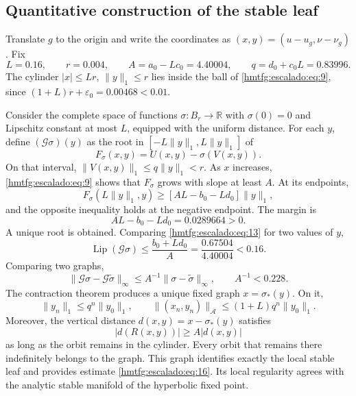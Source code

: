 \subsection{Quantitative construction of the stable leaf}
\label{hmtfg:escalado:5}

Translate \(g\) to the origin and write the coordinates as \((x,y)=(u-u_g,\nu-\nu_g)\). Fix
\begin{equation}
L=0.16,\qquad r=0.004,\qquad
A=a_0-Lc_0=4.40004,\qquad q=d_0+c_0L=0.83996.
\label{hmtfg:escalado:eq:12}
\end{equation}
The cylinder \(|x|\le Lr\), \(\|y\|_1\le r\) lies inside the ball of \eqref{hmtfg:escalado:eq:9}, since
\((1+L)r+\varepsilon_0=0.00468<0.01\).

Consider the complete space of functions \(\sigma:B_r\to\mathbb R\) with \(\sigma(0)=0\) and Lipschitz constant at most \(L\), equipped with the uniform distance. For each \(y\), define \((\mathcal G\sigma)(y)\) as the root in \([-L\|y\|_1,L\|y\|_1]\) of
\begin{equation}
F_\sigma(x,y)=U(x,y)-\sigma(V(x,y)).
\label{hmtfg:escalado:eq:13}
\end{equation}
On that interval, \(\|V(x,y)\|_1\le q\|y\|_1<r\). As \(x\) increases, \eqref{hmtfg:escalado:eq:9} shows that \(F_\sigma\) grows with slope at least \(A\). At its endpoints,
\[
F_\sigma(L\|y\|_1,y)
\ge[AL-b_0-Ld_0]\|y\|_1,
\]
and the opposite inequality holds at the negative endpoint. The margin is
\begin{equation}
AL-b_0-Ld_0=0.0289664>0.
\label{hmtfg:escalado:eq:14}
\end{equation}
A unique root is obtained. Comparing \eqref{hmtfg:escalado:eq:13} for two values of \(y\),
\[
\operatorname{Lip}(\mathcal G\sigma)
\le\frac{b_0+Ld_0}{A}
=\frac{0.67504}{4.40004}<0.16.
\]
Comparing two graphs,
\begin{equation}
\|\mathcal G\sigma-\mathcal G\widetilde\sigma\|_\infty
\le A^{-1}\|\sigma-\widetilde\sigma\|_\infty,
\qquad A^{-1}<0.228.
\label{hmtfg:escalado:eq:15}
\end{equation}
The contraction theorem produces a unique fixed graph \(x=\sigma_*(y)\). On it,
\begin{equation}
\|y_n\|_1\le q^n\|y_0\|_1,
\qquad
\|(x_n,y_n)\|_{\mathcal A}\le(1+L)q^n\|y_0\|_1.
\label{hmtfg:escalado:eq:16}
\end{equation}
Moreover, the vertical distance \(d(x,y)=x-\sigma_*(y)\) satisfies
\[
|d(R(x,y))|\ge A|d(x,y)|
\]
as long as the orbit remains in the cylinder. Every orbit that remains there indefinitely belongs to the graph. This graph identifies exactly the local stable leaf and provides estimate \eqref{hmtfg:escalado:eq:16}. Its local regularity agrees with the analytic stable manifold of the hyperbolic fixed point.


